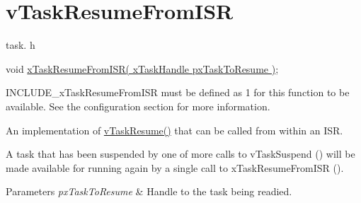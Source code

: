 \hypertarget{group__v_task_resume_from_i_s_r}{\section{v\-Task\-Resume\-From\-I\-S\-R}
\label{group__v_task_resume_from_i_s_r}
}
task. h 
\begin{DoxyPre}void \hyperlink{win32_2win32_2_libraries_2_free_r_t_o_s_2_source_2tasks_8c_a34169c2f610f3dc919b58434de245ba1}{xTaskResumeFromISR( xTaskHandle pxTaskToResume )};\end{DoxyPre}


I\-N\-C\-L\-U\-D\-E\-\_\-x\-Task\-Resume\-From\-I\-S\-R must be defined as 1 for this function to be available. See the configuration section for more information.

An implementation of \hyperlink{_common_2_libraries_2_free_r_t_o_s_2_source_2include_2task_8h_a7fa2251fa4af33a27b23b9c481023735}{v\-Task\-Resume()} that can be called from within an I\-S\-R.

A task that has been suspended by one of more calls to v\-Task\-Suspend () will be made available for running again by a single call to x\-Task\-Resume\-From\-I\-S\-R ().


\begin{DoxyParams}{Parameters}
{\em px\-Task\-To\-Resume} & Handle to the task being readied. \\
\hline
\end{DoxyParams}
